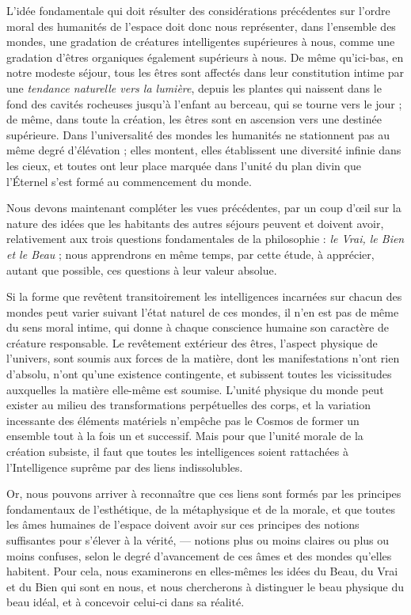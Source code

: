\documentclass[a4paper, 11pt, oneside, landscape]{article}
\begin{document}
L'idée fondamentale qui doit résulter des considérations précédentes sur l'ordre moral des humanités de l'espace doit donc nous représenter, dans l'ensemble des mondes, une gradation de créatures intelligentes supérieures à nous, comme une gradation d'êtres organiques également supérieurs à nous. De même qu'ici-bas, en notre modeste séjour, tous les êtres sont affectés dans leur constitution intime par une \emph{tendance naturelle vers la lumière}, depuis les plantes qui naissent dans le fond des cavités rocheuses jusqu'à l'enfant au berceau, qui se tourne vers le jour ; de même, dans toute la création, les êtres sont en ascension vers une destinée supérieure. Dans l'universalité des mondes les humanités ne stationnent pas au même degré d'élévation ; elles montent, elles établissent une diversité infinie dans les cieux, et toutes ont leur place marquée dans l'unité du plan divin que l'Éternel s'est formé au commencement du monde.

Nous devons maintenant compléter les vues précédentes, par un coup d'œil sur la nature des idées que les habitants des autres séjours peuvent et doivent avoir, relativement aux trois questions fondamentales de la philosophie : \emph{le Vrai, le Bien et le Beau} ; nous apprendrons en même temps, par cette étude, à apprécier, autant que possible, ces questions à leur valeur absolue.

Si la forme que revêtent transitoirement les intelligences incarnées sur chacun des mondes peut varier suivant l'état naturel de ces mondes, il n'en est pas de même du sens moral intime, qui donne à chaque conscience humaine son caractère de créature responsable. Le revêtement extérieur des êtres, l'aspect physique de l'univers, sont soumis aux forces de la matière, dont les manifestations n'ont rien d'absolu, n'ont qu'une existence contingente, et subissent toutes les vicissitudes auxquelles la matière elle-même est soumise. L'unité physique du monde peut exister au milieu des transformations perpétuelles des corps, et la variation incessante des éléments matériels n'empêche pas le Cosmos de former un ensemble tout à la fois un et successif. Mais pour que l'unité morale de la création subsiste, il faut que toutes les intelligences soient rattachées à l'Intelligence suprême par des liens indissolubles.

Or, nous pouvons arriver à reconnaître que ces liens sont formés par les principes fondamentaux de l'esthétique, de la métaphysique et de la morale, et que toutes les âmes humaines de l'espace doivent avoir sur ces principes des notions suffisantes pour s'élever à la vérité, --- notions plus ou moins claires ou plus ou moins confuses, selon le degré d'avancement de ces âmes et des mondes qu'elles habitent. Pour cela, nous examinerons en elles-mêmes les idées du Beau, du Vrai et du Bien qui sont en nous, et nous chercherons à distinguer le beau physique du beau idéal, et à concevoir celui-ci dans sa réalité.
\end{document}
